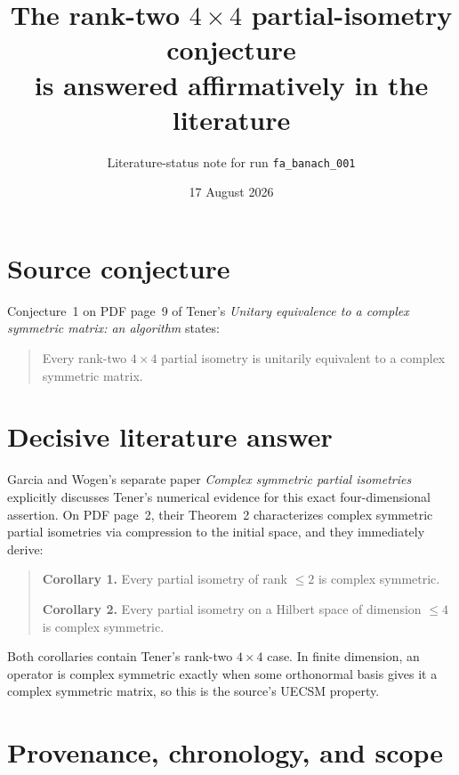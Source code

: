 \documentclass[10pt]{article}
\title{The rank-two $4\times4$ partial-isometry conjecture\\
is answered affirmatively in the literature}
\author{Literature-status note for run \texttt{fa\_banach\_001}}
\date{17 August 2026}
\begin{document}
\maketitle

\begin{center}
\end{center}

\section*{Source conjecture}

Conjecture~1 on PDF page~9 of Tener's
\emph{Unitary equivalence to a complex symmetric matrix: an algorithm}
\cite{Tener} states:
\begin{quote}
Every rank-two $4\times4$ partial isometry is unitarily equivalent to a
complex symmetric matrix.
\end{quote}

\section*{Decisive literature answer}

Garcia and Wogen's separate paper \emph{Complex symmetric partial isometries}
\cite{GW} explicitly discusses Tener's numerical evidence for this exact
four-dimensional assertion.  On PDF page~2, their Theorem~2 characterizes
complex symmetric partial isometries via compression to the initial space,
and they immediately derive:
\begin{quote}
\textbf{Corollary 1.} Every partial isometry of rank $\leq2$ is complex
symmetric.

\textbf{Corollary 2.} Every partial isometry on a Hilbert space of dimension
$\leq4$ is complex symmetric.
\end{quote}
Both corollaries contain Tener's rank-two $4\times4$ case.  In finite
dimension, an operator is complex symmetric exactly when some orthonormal
basis gives it a complex symmetric matrix, so this is the source's UECSM
property.

\section*{Provenance, chronology, and scope}
\end{document}

